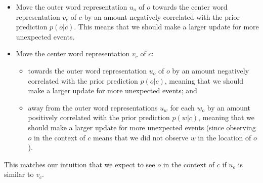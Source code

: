 \begin{itemize}
\item Move the outer word representation $u_o$ of $o$ towards the center word representation $v_c$ of $c$ by an amount negatively correlated with the prior prediction $p(o | c)$. This means that we should make a larger update for more unexpected events.
\item Move the center word representation $v_c$ of $c$:
\begin{itemize}
\item towards the outer word representation $u_o$ of $o$ by an amount negatively correlated with the prior prediction $p(o | c)$, meaning that we should make a larger update for more unexpected events; and
\item away from the outer word representations $u_w$ for each $w_o$ by an amount positively correlated with the prior prediction $p(w | c)$, meaning that we should make a larger update for more unexpected events (since observing $o$ in the context of $c$ means that we did not observe $w$ in the location of $o$).
\end{itemize}
\end{itemize}
This matches our intuition that we expect to see $o$ in the context of $c$ if $u_o$ is similar to $v_c$.
